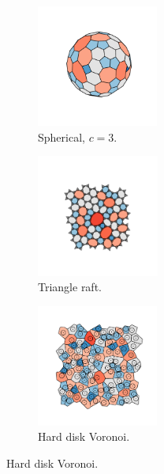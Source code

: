 \begin{figure}[bt]
     \vspace{0.2cm}
      \begin{subfigure}[b]{0.25\textwidth}
         \centering
         \includegraphics[height=4cm]{./figures/general_networks/afull92.pdf}
         \caption{Spherical, $c=3$.}
         \label{fig:ne4}
     \end{subfigure}
     \hfill
     \begin{subfigure}[b]{0.25\textwidth}
         \centering
         \includegraphics[height=4cm]{./figures/general_networks/traft.pdf}
         \caption{Triangle raft.}
         \label{fig:ne5}
     \end{subfigure}
     \hfill
     \begin{subfigure}[b]{0.25\textwidth}
         \centering
         \includegraphics[height=4cm]{./figures/general_networks/colloid.pdf}
         \caption{Hard disk Voronoi.}
         \label{fig:ne6}
     \end{subfigure}
     \hfill
     

\end{figure}
